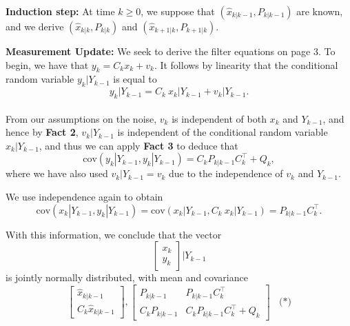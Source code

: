 \documentclass[letterpaper]{article}
\newcommand{\cov}{\mathrm{cov}}
\begin{document}
\noindent \textbf{Induction step:} At time $k\ge0$, we suppose that $(\widehat{x}_{k|k-1}, P_{k|k-1})$ are known, and we derive $(\widehat{x}_{k|k}, P_{k|k})$ and $(\widehat{x}_{k+1|k}, P_{k+1|k})$.


\noindent  \textbf{Measurement Update:}  We seek to derive the filter equations on page 3. To begin, we have that $y_k = C_k x_k + v_k$. It follows by linearity that the conditional random variable $y_k | Y_{k-1}$ is equal to
$$y_k|Y_{k-1} = C_k ~x_k|Y_{k-1} + v_k|Y_{k-1}.$$\\

From our assumptions on the noise, $v_k$ is independent of both $x_k$ and $Y_{k-1}$, and hence by \textbf{Fact 2}, $v_k|Y_{k-1} $ is independent of the conditional random variable $x_k|Y_{k-1}$, and thus we can apply
 \textbf{Fact 3} to deduce that
$$ \cov(y_k|Y_{k-1}, y_k|Y_{k-1}) = C_k P_{k|k-1} C_k^\top  + Q_k,$$
where we have also used $v_k|Y_{k-1} =v_k$ due to the independence of $v_k$ and $Y_{k-1}$.

We use independence again to obtain
$$\cov(x_k|Y_{k-1},y_k |Y_{k-1}) = \cov(x_k|Y_{k-1},C_k ~x_k|Y_{k-1})=P_{k|k-1} C_k^\top.$$

\newpage

With this information, we conclude that  the vector
$$ \left[ \begin{array}{c} x_k\\y_k \end{array} \right] | Y_{k-1}$$
is jointly normally distributed, with mean and covariance
$$\left[ \begin{array}{r} \widehat{x}_{k|k-1} \\ C_k  \widehat{x}_{k|k-1} \end{array} \right], \left[ \begin{array}{cc}  P_{k|k-1} &  P_{k|k-1} C_k^\top\\ C_k  P_{k|k-1} & C_k P_{k|k-1} C_k^\top  + Q_k \end{array} \right] ~~~~\textbf{(*)}$$
\end{document}

